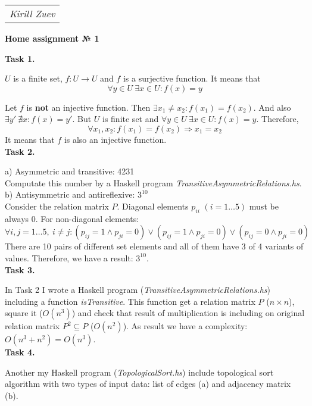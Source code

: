 \documentclass{article}
\begin{document}
\null\hfill\begin{tabular}[t]{l@{}}
	\textit{Kirill Zuev}
\end{tabular}

\begin{center}
	\textbf{Home assignment № 1}
\end{center}

\textbf{Task 1.}

$U$ is a finite set, $f: U \to U$ and $f$ is a surjective function. It means that
$$\forall y \in U~\exists x \in U: f(x) = y$$

Let $f$ is \textbf{not} an injective function. Then $\exists x_1 \neq x_2: f(x_1) = f(x_2)$. And also $\exists y'~\nexists x: f(x) = y'$. But $U$ is finite set and $\forall y \in U~\exists x \in U: f(x) = y$. Therefore,
$$\forall x_1, x_2: f(x_1) = f(x_2) \Rightarrow x_1 = x_2 $$
It means that $f$ is also an injective function.\\

\textbf{Task 2.}

a) Asymmetric and transitive: 4231\\
Computate this number by a Haskell program \textit{TransitiveAsymmetricRelations.hs}.\\

b) Antisymmetric and antireflexive: $3^{10}$\\
Consider the relation matrix $P$. Diagonal elements $p_{ii}$ $(i = 1 \dots 5)$ must be always 0. For non-diagonal elements:
$$\forall i, j = 1 \dots 5,~i \neq j: (p_{ij} = 1 \land p_{ji} = 0) \lor (p_{ij} = 1 \land p_{ji} = 0) \lor (p_{ij} = 0 \land p_{ji} = 0) $$
There are 10 pairs of different set elements and all of them have 3 of 4 variants of values. Therefore, we have a result: $3^{10}$.\\

\textbf{Task 3.}

In Task 2 I wrote a Haskell program (\textit{TransitiveAsymmetricRelations.hs}) including a function \textit{isTransitive}. This function get a relation matrix $P$ ($n \times n$), square it ($O(n^3)$) and check that result of multiplication is including on original relation matrix $P^2 \subseteq P$ ($O(n^2)$). As result we have a complexity: $O(n^3 + n^2) = O(n^3)$.\\

\textbf{Task 4.}

Another my Haskell program (\textit{TopologicalSort.hs}) include topological sort algorithm with two types of input data: list of edges (a) and adjacency matrix (b).\\
\end{document}
